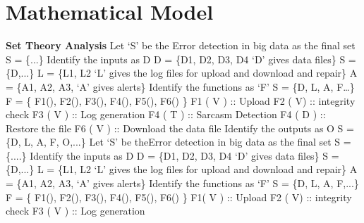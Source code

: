 \documentclass[oneside,a4paper,12pt]{book}
\begin{document}
\section{Mathematical Model}
\textbf{Set Theory Analysis}
Let ‘S’ be the Error detection in big data as the final set S = \{...\}\newline
Identify the inputs as D \newline
D = \{D1, D2, D3, D4  ‘D’ gives data files\}\newline
S = \{D,...\}\newline
L = \{L1, L2  ‘L’ gives the log files for upload and download and repair\}\newline
A = \{A1, A2, A3,  ‘A’ gives alerts\}\newline
Identify the functions as ‘F’\newline
S = \{D, L, A, F…\}\newline
F = \{ F1(), F2(), F3(), F4(), F5(), F6() \}\newline
F1 ( V ) :: Upload\newline
F2 ( V) :: integrity check \newline
F3 ( V ) :: Log generation\newlineW
F4 ( T ) :: Sarcasm Detection\newline
F4 ( D ) :: Restore the file\newline
F6 ( V ) :: Download the data file\newline
Identify the outputs as O\newline
S = \{D, L, A, F, O,...\}\newline
Let ‘S’ be theError detection in big data as the final set S = \{....\}\newline
Identify the inputs as D 
D = \{D1, D2, D3, D4  ‘D’ gives data files\}\newline
S = \{D,...\}\newline
L = \{L1, L2  ‘L’ gives the log files for upload and download and repair\}\newline
A = \{A1, A2, A3,  ‘A’ gives alerts\}\newline
Identify the functions as ‘F’\newline
S = \{D, L, A, F,...\}\newline
F = \{ F1(), F2(), F3(), F4(), F5(), F6() \}\newline
F1( V ) :: Upload\newline
F2 ( V) :: integrity check\newline 
F3 ( V ) :: Log generation\newline
\end{document}
